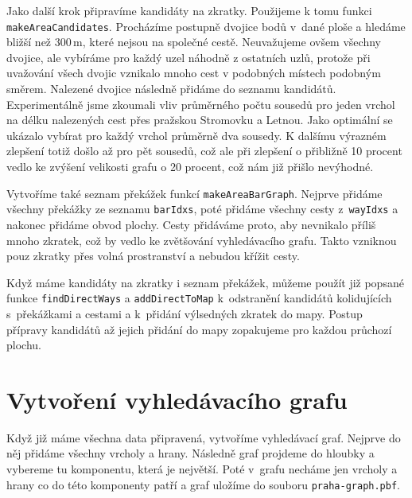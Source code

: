 Jako další krok připravíme kandidáty na zkratky. Použijeme k tomu funkci
\verb|makeAreaCandidates|. Procházíme postupně dvojice bodů v~dané ploše a
hledáme bližší než 300\,m, které nejsou na společné cestě. Neuvažujeme ovšem
všechny dvojice, ale vybíráme pro každý uzel náhodně z ostatních uzlů, protože
při uvažování všech dvojic vznikalo mnoho cest v podobných místech podobným
směrem. Nalezené dvojice následně přidáme do seznamu kandidátů. Experimentálně
jsme zkoumali vliv průměrného počtu sousedů pro jeden vrchol na délku nalezených
cest přes pražskou Stromovku a Letnou. Jako optimální se ukázalo vybírat pro
každý vrchol průměrně dva sousedy. K dalšímu výrazném zlepšení totiž došlo až
pro pět sousedů, což ale při zlepšení o přibližně 10 procent vedlo ke zvýšení
velikosti grafu o 20 procent, což nám již  přišlo nevýhodné.

Vytvoříme také seznam překážek funkcí \verb|makeAreaBarGraph|. Nejprve přidáme
všechny překážky ze seznamu \verb|barIdxs|, poté přidáme všechny cesty
z~\verb|wayIdxs| a nakonec přidáme obvod plochy. Cesty přidáváme proto, aby
nevnikalo příliš mnoho zkratek, což by vedlo ke zvětšování vyhledávacího grafu.
Takto vzniknou pouz zkratky přes volná prostranství a nebudou křížit cesty.

Když máme kandidáty na zkratky i seznam překážek, můžeme použít již popsané funkce
\verb|findDirectWays| a \verb|addDirectToMap| k~odstranění kandidátů
kolidujících
s~překážkami a cestami a k~přidání výlsedných zkratek do mapy. Postup přípravy
kandidátů až jejich přidání do mapy zopakujeme pro každou průchozí plochu.

\section{Vytvoření vyhledávacího grafu}
Když již máme všechna data připravená, vytvoříme vyhledávací graf. Nejprve do
něj přidáme všechny vrcholy a hrany. Následně graf projdeme do hloubky a
vybereme tu komponentu, která je největší. Poté v~grafu necháme jen vrcholy a
hrany co do této komponenty patří a graf uložíme do souboru
\verb|praha-graph.pbf|. 
